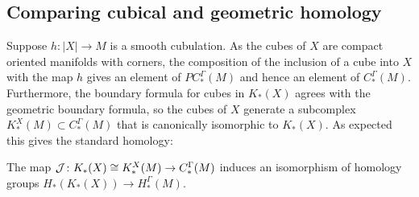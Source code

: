 \subsection{Comparing cubical and geometric homology}\label{S: cubical and geometric homology}

Suppose $h \colon |X| \to M$ is a smooth cubulation.
As the cubes of $X$ are compact oriented manifolds with corners, the composition of the inclusion of a cube into $X$ with the map $h$ gives an element of $PC_*^\Gamma(M)$ and hence an element of $C_*^\Gamma(M)$.
Furthermore, the boundary formula for cubes in $K_*(X)$ agrees with the geometric boundary formula, so the cubes of $X$ generate a subcomplex $K^X_*(M) \subset C^\Gamma_*(M)$ that is canonically isomorphic to $K_*(X)$.
As expected this gives the standard homology:

\begin{theorem}\label{T: cubical homology iso}
	The map $\mathcal{J} \colon K_*(X) \cong K^X_*(M) \to C^\Gamma_*(M)$ induces an isomorphism of homology groups $H_*(K_*(X)) \to H_*^\Gamma(M)$.
\end{theorem}

